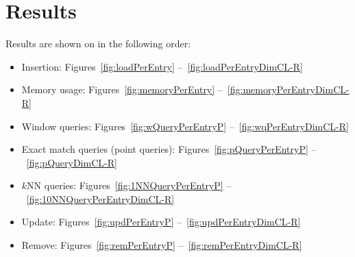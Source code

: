 \documentclass{vldb}
\begin{document}
%


\section{Results}
Results are shown on in the following order:

\begin{itemize}
	\item Insertion: Figures~\ref{fig:loadPerEntry} --~\ref{fig:loadPerEntryDimCL-R}
	\item Memory usage: Figures~\ref{fig:memoryPerEntry} --~\ref{fig:memoryPerEntryDimCL-R}
	\item Window queries: Figures~\ref{fig:wQueryPerEntryP} --~\ref{fig:wqPerEntryDimCL-R}
	\item Exact match queries (point queries): Figures~\ref{fig:pQueryPerEntryP} --~\ref{fig:pQueryDimCL-R}
	\item $k$NN queries: Figures~\ref{fig:1NNQueryPerEntryP} --~\ref{fig:10NNQueryPerEntryDimCL-R}
	\item Update: Figures~\ref{fig:updPerEntryP} --~\ref{fig:updPerEntryDimCL-R}
	\item Remove: Figures~\ref{fig:remPerEntryP} --~\ref{fig:remPerEntryDimCL-R}
\end{itemize}




\clearpage
\newpage



\clearpage
\newpage




\clearpage
\newpage



\clearpage
\newpage



\clearpage
\newpage



\clearpage
\newpage



\clearpage
\newpage
\end{document}
